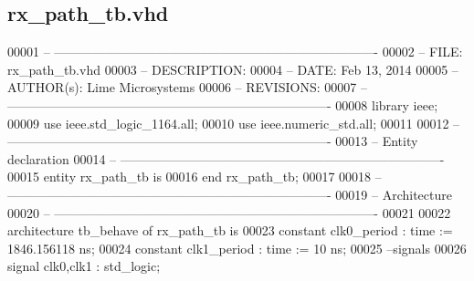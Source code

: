\subsection{rx\+\_\+path\+\_\+tb.\+vhd}
\label{rx__path__tb_8vhd_source}

\begin{DoxyCode}
00001 \textcolor{keyword}{-- ---------------------------------------------------------------------------- }
00002 \textcolor{keyword}{-- FILE:    rx\_path\_tb.vhd}
00003 \textcolor{keyword}{-- DESCRIPTION: }
00004 \textcolor{keyword}{-- DATE:    Feb 13, 2014}
00005 \textcolor{keyword}{-- AUTHOR(s):   Lime Microsystems}
00006 \textcolor{keyword}{-- REVISIONS:}
00007 \textcolor{keyword}{-- ---------------------------------------------------------------------------- }
00008 \textcolor{vhdlkeyword}{library }\textcolor{keywordflow}{ieee};
00009 \textcolor{vhdlkeyword}{use }ieee.std\_logic\_1164.\textcolor{keywordflow}{all};
00010 \textcolor{vhdlkeyword}{use }ieee.numeric\_std.\textcolor{keywordflow}{all};
00011 
00012 \textcolor{keyword}{-- ----------------------------------------------------------------------------}
00013 \textcolor{keyword}{-- Entity declaration}
00014 \textcolor{keyword}{-- ----------------------------------------------------------------------------}
00015 \textcolor{keywordflow}{entity }rx_path_tb \textcolor{keywordflow}{is}
00016 \textcolor{keywordflow}{end} \textcolor{vhdlchar}{rx\_path\_tb};
00017 
00018 \textcolor{keyword}{-- ----------------------------------------------------------------------------}
00019 \textcolor{keyword}{-- Architecture}
00020 \textcolor{keyword}{-- ----------------------------------------------------------------------------}
00021 
00022 \textcolor{keywordflow}{architecture} tb\_behave \textcolor{keywordflow}{of} rx_path_tb is
00023     \textcolor{keywordflow}{constant} \textcolor{vhdlchar}{clk0_period}   \textcolor{vhdlchar}{:} \textcolor{comment}{time} \textcolor{vhdlchar}{:=} \textcolor{vhdllogic}{}\textcolor{vhdllogic}{1846}.\textcolor{vhdllogic}{156118} \textcolor{vhdlchar}{ns};
00024     \textcolor{keywordflow}{constant} \textcolor{vhdlchar}{clk1_period}   \textcolor{vhdlchar}{:} \textcolor{comment}{time} \textcolor{vhdlchar}{:=} \textcolor{vhdllogic}{}\textcolor{vhdllogic}{10} \textcolor{vhdlchar}{ns}; 
00025 \textcolor{keyword}{  --signals}
00026     \textcolor{keywordflow}{signal} \textcolor{vhdlchar}{clk0}\textcolor{vhdlchar}{,}\textcolor{vhdlchar}{clk1}        \textcolor{vhdlchar}{:} \textcolor{comment}{std\_logic};

\end{DoxyCode}
